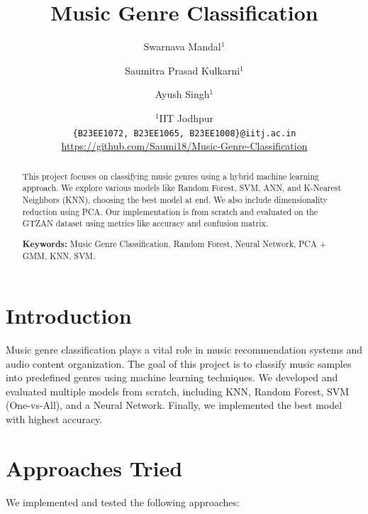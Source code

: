 \documentclass[a4paper]{article}
\title{Music Genre Classification}
\author{Swarnava Mandal$^1$ \and Saumitra Prasad Kulkarni$^1$ \and Ayush Singh$^1$}
\date{
	$^1$IIT Jodhpur \\ \texttt{\{B23EE1072, B23EE1065, B23EE1008\}@iitj.ac.in} \\[2ex]
	\url{https://github.com/Saumi18/Music-Genre-Classification}
}
\theoremstyle{plain}
\theoremstyle{definition}
\begin{document}
\maketitle

\begin{abstract}
This project focuses on classifying music genres using a hybrid machine learning approach. We explore various models like Random Forest, SVM, ANN, and K-Nearest Neighbors (KNN), choosing the best model at end. We also include dimensionality reduction using PCA. Our implementation is from scratch and evaluated on the GTZAN dataset using metrics like accuracy and confusion matrix.
\vspace{1cm}

\noindent\textbf{Keywords:} Music Genre Classification, Random Forest, Neural Network, PCA + GMM, KNN, SVM.
\end{abstract}

\tableofcontents

\section{Introduction}
\label{sec:intro}
Music genre classification plays a vital role in music recommendation systems and audio content organization. The goal of this project is to classify music samples into predefined genres using machine learning techniques. We developed and evaluated multiple models from scratch, including KNN, Random Forest, SVM (One-vs-All), and a Neural Network. Finally, we implemented the best model with highest accuracy.

\section{Approaches Tried}
\label{sec:app}

We implemented and tested the following approaches:
\end{document}

